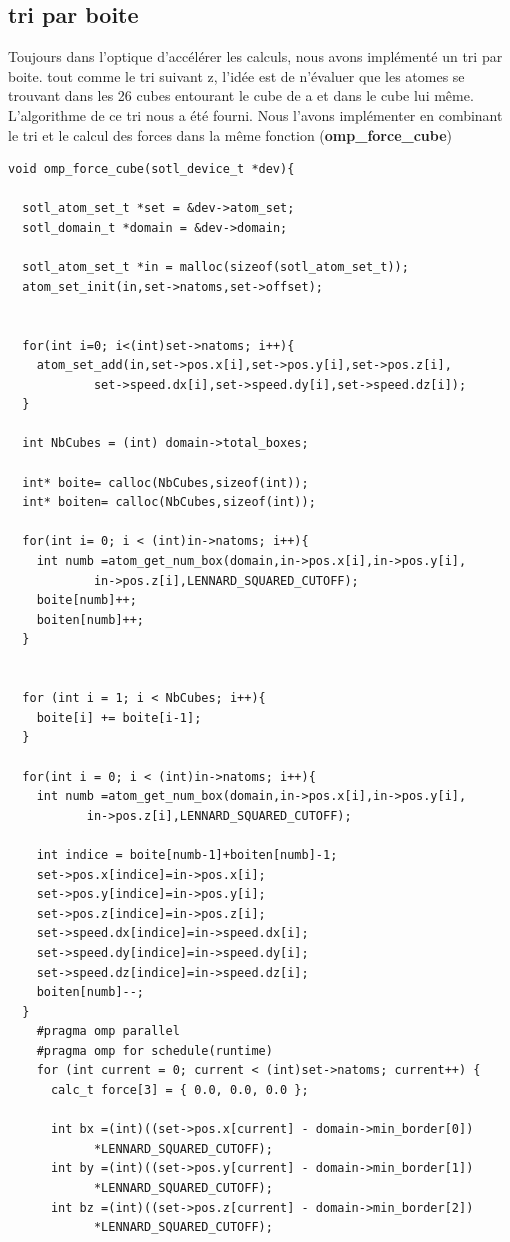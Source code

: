 \documentclass[a4paper,11pt]{report}
\begin{document}
\subsection{tri par boite}
Toujours dans l'optique d'accélérer les calculs, nous avons implémenté un tri par boite. tout comme le tri suivant z, l'idée est de n'évaluer que les atomes se trouvant dans les 26 cubes entourant le cube de a et dans le cube lui même. L'algorithme de ce tri nous a été fourni. Nous l'avons implémenter en combinant le tri et le calcul des forces dans la même fonction (\textbf{omp\_force\_cube})
\newline 
\begin{lstlisting}[style=CStyle]
void omp_force_cube(sotl_device_t *dev){
	
  sotl_atom_set_t *set = &dev->atom_set;
  sotl_domain_t *domain = &dev->domain;

  sotl_atom_set_t *in = malloc(sizeof(sotl_atom_set_t));
  atom_set_init(in,set->natoms,set->offset);

 
  for(int i=0; i<(int)set->natoms; i++){
    atom_set_add(in,set->pos.x[i],set->pos.y[i],set->pos.z[i],
			set->speed.dx[i],set->speed.dy[i],set->speed.dz[i]);
  }

  int NbCubes = (int) domain->total_boxes;

  int* boite= calloc(NbCubes,sizeof(int));
  int* boiten= calloc(NbCubes,sizeof(int));

  for(int i= 0; i < (int)in->natoms; i++){
    int numb =atom_get_num_box(domain,in->pos.x[i],in->pos.y[i],
			in->pos.z[i],LENNARD_SQUARED_CUTOFF);
    boite[numb]++;
    boiten[numb]++;
  }

  
  for (int i = 1; i < NbCubes; i++){
    boite[i] += boite[i-1];
  }
	
  for(int i = 0; i < (int)in->natoms; i++){
    int numb =atom_get_num_box(domain,in->pos.x[i],in->pos.y[i],
		   in->pos.z[i],LENNARD_SQUARED_CUTOFF);
    
    int indice = boite[numb-1]+boiten[numb]-1;
    set->pos.x[indice]=in->pos.x[i];
    set->pos.y[indice]=in->pos.y[i];
    set->pos.z[indice]=in->pos.z[i];
    set->speed.dx[indice]=in->speed.dx[i];
    set->speed.dy[indice]=in->speed.dy[i];
    set->speed.dz[indice]=in->speed.dz[i];
    boiten[numb]--;	
  }
    #pragma omp parallel 
    #pragma omp for schedule(runtime)
    for (int current = 0; current < (int)set->natoms; current++) {
      calc_t force[3] = { 0.0, 0.0, 0.0 };

      int bx =(int)((set->pos.x[current] - domain->min_border[0]) 
			*LENNARD_SQUARED_CUTOFF);
      int by =(int)((set->pos.y[current] - domain->min_border[1]) 
			*LENNARD_SQUARED_CUTOFF);
      int bz =(int)((set->pos.z[current] - domain->min_border[2]) 
			*LENNARD_SQUARED_CUTOFF);
      

\end{lstlisting}
\end{document}
